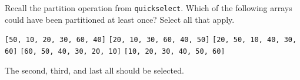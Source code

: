 \begin{prob}
    Recall the partition operation from \texttt{quickselect}.
    Which of the following arrays could have been partitioned at least once?
    Select all that apply.

    \begin{choices}[rectangle]
        \choice \texttt{[50, 10, 20, 30, 60, 40]}
        \correctchoice \texttt{[20, 10, 30, 60, 40, 50]}
        \correctchoice \texttt{[20, 50, 10, 40, 30, 60]}
        \choice \texttt{[60, 50, 40, 30, 20, 10]}
        \correctchoice \texttt{[10, 20, 30, 40, 50, 60]}
    \end{choices}

    \begin{soln}
        The second, third, and last all should be selected.
    \end{soln}
\end{prob}
